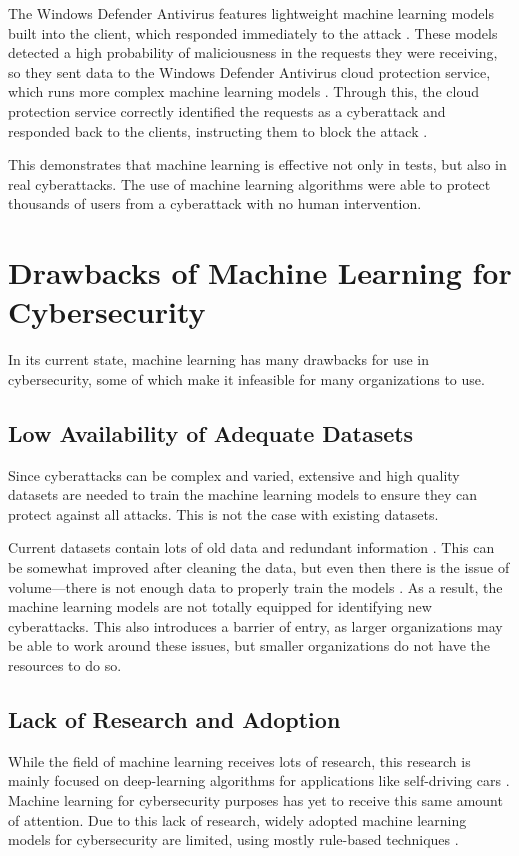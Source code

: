 The Windows Defender Antivirus features lightweight machine learning models built into the client, which responded immediately to the attack \cite{microsoft2018}.
These models detected a high probability of maliciousness in the requests they were receiving, so they sent data to the Windows Defender Antivirus cloud protection service, which runs more complex machine learning models \cite{microsoft2018}.
Through this, the cloud protection service correctly identified the requests as a cyberattack and responded back to the clients, instructing them to block the attack \cite{microsoft2018}.

This demonstrates that machine learning is effective not only in tests, but also in real cyberattacks.
The use of machine learning algorithms were able to protect thousands of users from a cyberattack with no human intervention.

\section{Drawbacks of Machine Learning for Cybersecurity}
In its current state, machine learning has many drawbacks for use in cybersecurity, some of which make it infeasible for many organizations to use.

\subsection{Low Availability of Adequate Datasets}
Since cyberattacks can be complex and varied, extensive and high quality datasets are needed to train the machine learning models to ensure they can protect against all attacks.
This is not the case with existing datasets.

Current datasets contain lots of old data and redundant information \cite{xin2018}.
This can be somewhat improved after cleaning the data, but even then there is the issue of volume---there is not enough data to properly train the models \cite{xin2018}.
As a result, the machine learning models are not totally equipped for identifying new cyberattacks.
This also introduces a barrier of entry, as larger organizations may be able to work around these issues, but smaller organizations do not have the resources to do so.

\subsection{Lack of Research and Adoption}
While the field of machine learning receives lots of research, this research is mainly focused on deep-learning algorithms for applications like self-driving cars \cite{grandchallenge2019}.
Machine learning for cybersecurity purposes has yet to receive this same amount of attention.
Due to this lack of research, widely adopted machine learning models for cybersecurity are limited, using mostly rule-based techniques \cite{grandchallenge2019}.

